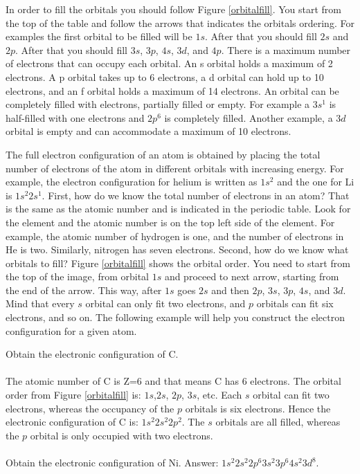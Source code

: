 \documentclass[main.tex]{subfiles}
\begin{document}
\begin{description}
In order to fill the orbitals you should follow Figure \ref{orbitalfill}. You start from the top of the table and follow the arrows that indicates the orbitals ordering. For examples the first orbital to be filled will be $1s$. After that you should fill  $2s$ and  $2p$. After that you should fill $3s$, $3p$, $4s$, $3d$, and $4p$. There is a maximum number of electrons that can occupy each orbital. An s orbital holds a maximum of 2 electrons. A p orbital takes up to 6 electrons, a d orbital can hold up to 10 electrons, and an f orbital holds a maximum of 14 electrons. An orbital can be completely filled with electrons, partially filled or empty. For example a $3s^1$ is half-filled with one electrons and $2p^6$ is completely filled. Another example, a $3d$ orbital is empty and can accommodate a maximum of 10 electrons.

\item[\docfilehook{Full electron Configuration}{Full electron Configuration}] The full electron configuration of an atom is obtained by placing the total number of electrons of the atom in different orbitals with increasing energy. For example, the electron configuration for helium is written as $1s^2$ and the one for Li is $1s^2 2s^1$.  First, how do we know the total number of electrons in an atom? That is the same as the atomic number and is indicated in the periodic table. Look for the element and the atomic number is on the top left side of the element. For example, the atomic number of hydrogen is one, and the number of electrons in He is two. Similarly, nitrogen has seven electrons. Second, how do we know what orbitals to fill? Figure \ref{orbitalfill} shows the orbital order. You need to start from the top of the image, from orbital $1s$ and proceed to next arrow, starting from the end of the arrow. This way, after $1s$ goes $2s$ and then $2p$, $3s$, $3p$, $4s$, and $3d$. Mind that every $s$ orbital can only fit two electrons, and $p$ orbitals can fit six electrons, and so on. The following example will help you construct the electron configuration for a given atom.




\begin{example} %
Obtain the electronic configuration of C.\\
\textlcsc{ \textcolor{dgreen}{\Large Solution} }\\
The atomic number of C is Z=6 and that means C has 6 electrons. The orbital order from Figure \ref{orbitalfill} is: $1s$,$2s$, $2p$, $3s$, etc. Each $s$ orbital can fit two electrons, whereas the occupancy of  the $p$ orbitals is six electrons. Hence the electronic configuration of C is: $1s^2 2s^2 2p^2$. The $s$ orbitals are all filled, whereas the $p$ orbital is only occupied with two electrons.
\\
\faDiamond\ \\Obtain the electronic configuration of Ni.
\flushright Answer: $1s^2 2s^2 2p^6 3s^2 3p^6 4s^2 3d^8$. 
\end{example}%



\end{description}
\end{document}
